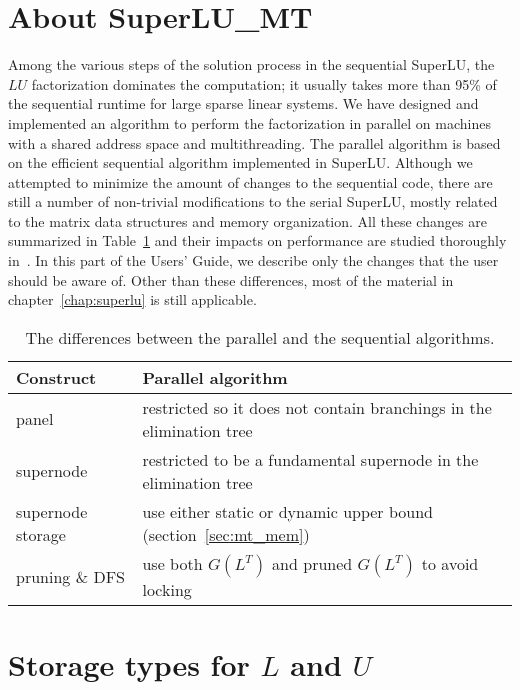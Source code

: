 \section{About SuperLU\_MT}
Among the various steps of the solution process in the sequential SuperLU,
the $LU$ factorization dominates the computation; it usually takes more than
95\% of the sequential runtime for large sparse linear systems.
We have designed and implemented an
algorithm to perform the factorization in parallel on machines
with a shared address space and multithreading.
The parallel algorithm is based on the efficient
sequential algorithm implemented in SuperLU. Although we attempted
to minimize the amount of changes to the sequential code, there are
still a number of non-trivial modifications to the serial SuperLU,
mostly related to the matrix data structures and memory organization.
All these changes are summarized in Table~\ref{tab:diff_superlu} and their
impacts on performance are studied thoroughly in~\cite{superlu_smp99,li96}.
In this part of the Users' Guide, we describe only the changes that 
the user should be aware of. Other than these differences, most of the
material in chapter~\ref{chap:superlu} is still applicable.

\begin{table}[h]
\begin{center}
\begin{tabular}{|l|l|}\hline
Construct	&Parallel algorithm \\\hline
panel		&restricted so it does not contain branchings in the elimination tree \\
supernode	&restricted to be a fundamental supernode in the elimination tree \\
supernode storage &use either static or dynamic upper bound 
		(section~\ref{sec:mt_mem}) \\
pruning \& DFS	&use both $G(L^T)$ and pruned $G(L^T)$ to avoid locking\\\hline
\end{tabular}
\end{center}
\vspace{-.1in}
\caption{The differences between the parallel and the sequential algorithms.}
\label{tab:diff_superlu}
\end{table}


\section{Storage types for $L$ and $U$}
\label{sec:mt_datastructure}

